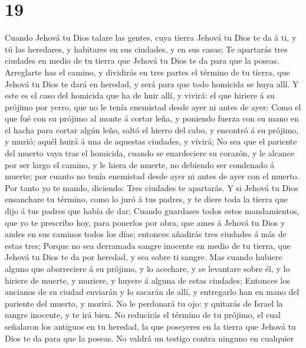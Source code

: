 \hypertarget{section-18}{%
\section{19}\label{section-18}}

 Cuando Jehová tu Dios talare las gentes, cuya tierra
Jehová tu Dios te da á ti, y tú las heredares, y habitares en sus
ciudades, y en sus casas;  Te apartarás tres ciudades en
medio de tu tierra que Jehová tu Dios te da para que la poseas.
 Arreglarte has el camino, y dividirás en tres partes el
término de tu tierra, que Jehová tu Dios te dará en heredad, y será para
que todo homicida se huya allí.  Y este es el caso del
homicida que ha de huir allí, y vivirá: el que hiriere á su prójimo por
yerro, que no le tenía enemistad desde ayer ni antes de ayer:
 Como el que fué con su prójimo al monte á cortar leña, y
poniendo fuerza con su mano en el hacha para cortar algún leño, saltó el
hierro del cabo, y encontró á su prójimo, y murió; aquél huirá á una de
aquestas ciudades, y vivirá;  No sea que el pariente del
muerto vaya tras el homicida, cuando se enardeciere su corazón, y le
alcance por ser largo el camino, y le hiera de muerte, no debiendo ser
condenado á muerte; por cuanto no tenía enemistad desde ayer ni antes de
ayer con el muerto.  Por tanto yo te mando, diciendo: Tres
ciudades te apartarás.  Y si Jehová tu Dios ensanchare tu
término, como lo juró á tus padres, y te diere toda la tierra que dijo á
tus padres que había de dar;  Cuando guardases todos estos
mandamientos, que yo te prescribo hoy, para ponerlos por obra, que ames
á Jehová tu Dios y andes en sus caminos todos los días; entonces
añadirás tres ciudades á más de estas tres;  Porque no
sea derramada sangre inocente en medio de tu tierra, que Jehová tu Dios
te da por heredad, y sea sobre ti sangre.  Mas cuando
hubiere alguno que aborreciere á su prójimo, y lo acechare, y se
levantare sobre él, y lo hiriere de muerte, y muriere, y huyere á alguna
de estas ciudades;  Entonces los ancianos de su ciudad
enviarán y lo sacarán de allí, y entregarlo han en mano del pariente del
muerto, y morirá.  No le perdonará tu ojo: y quitarás de
Israel la sangre inocente, y te irá bien.  No reducirás
el término de tu prójimo, el cual señalaron los antiguos en tu heredad,
la que poseyeres en la tierra que Jehová tu Dios te da para que la
poseas.  No valdrá un testigo contra ninguno en cualquier
